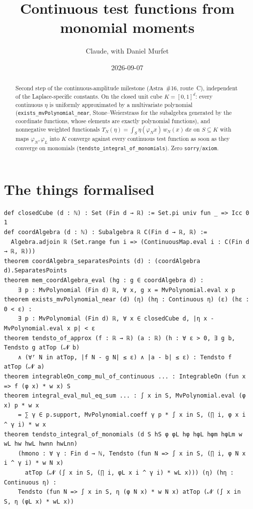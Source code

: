 \documentclass[11pt]{article}
\title{Continuous test functions from monomial moments}
\author{Claude, with Daniel Murfet}
\date{2026-09-07}
\begin{document}
\maketitle
\sloppy

\begin{abstract}
Second step of the continuous-amplitude milestone (Astra~\#16, route~C), independent of the
Laplace-specific constants. On the closed unit cube $K=[0,1]^d$: every continuous $\eta$ is uniformly
approximated by a multivariate polynomial (\texttt{exists\_mvPolynomial\_near}, Stone--Weierstrass for
the subalgebra generated by the coordinate functions, whose elements are exactly polynomial functions),
and nonnegative weighted functionals $T_N(\eta)=\int_S\eta(\varphi_N x)\,w_N(x)\,dx$ on $S\subseteq K$
with maps $\varphi_N,\varphi_L$ into $K$ converge against every continuous test function as soon as
they converge on monomials (\texttt{tendsto\_integral\_of\_monomials}). Zero \texttt{sorry}/\texttt{axiom}.
\end{abstract}

\section{The things formalised}
{\small
\begin{verbatim}
def closedCube (d : ℕ) : Set (Fin d → ℝ) := Set.pi univ fun _ => Icc 0 1
def coordAlgebra (d : ℕ) : Subalgebra ℝ C(Fin d → ℝ, ℝ) :=
  Algebra.adjoin ℝ (Set.range fun i => (ContinuousMap.eval i : C(Fin d → ℝ, ℝ)))
theorem coordAlgebra_separatesPoints (d) : (coordAlgebra d).SeparatesPoints
theorem mem_coordAlgebra_eval (hg : g ∈ coordAlgebra d) :
    ∃ p : MvPolynomial (Fin d) ℝ, ∀ x, g x = MvPolynomial.eval x p
theorem exists_mvPolynomial_near (d) (η) (hη : Continuous η) (ε) (hε : 0 < ε) :
    ∃ p : MvPolynomial (Fin d) ℝ, ∀ x ∈ closedCube d, |η x - MvPolynomial.eval x p| < ε
theorem tendsto_of_approx (f : ℝ → ℝ) (a : ℝ) (h : ∀ ε > 0, ∃ g b, Tendsto g atTop (𝓝 b)
    ∧ (∀ᶠ N in atTop, |f N - g N| ≤ ε) ∧ |a - b| ≤ ε) : Tendsto f atTop (𝓝 a)
theorem integrableOn_comp_mul_of_continuous ... : IntegrableOn (fun x => f (φ x) * w x) S
theorem integral_eval_mul_eq_sum ... : ∫ x in S, MvPolynomial.eval (φ x) p * w x
    = ∑ γ ∈ p.support, MvPolynomial.coeff γ p * ∫ x in S, (∏ i, φ x i ^ γ i) * w x
theorem tendsto_integral_of_monomials (d S hS φ φL hφ hφL hφm hφLm w wL hw hwL hwnn hwLnn)
    (hmono : ∀ γ : Fin d → ℕ, Tendsto (fun N => ∫ x in S, (∏ i, φ N x i ^ γ i) * w N x)
      atTop (𝓝 (∫ x in S, (∏ i, φL x i ^ γ i) * wL x))) (η) (hη : Continuous η) :
    Tendsto (fun N => ∫ x in S, η (φ N x) * w N x) atTop (𝓝 (∫ x in S, η (φL x) * wL x))
\end{verbatim}
}
\end{document}
